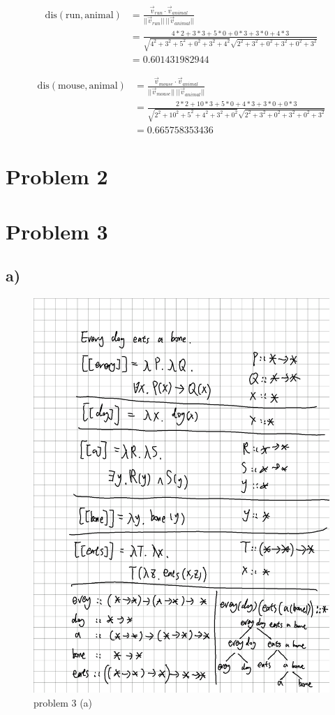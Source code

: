 \documentclass[twoside,11pt]{homework}
\begin{document}
\begin{itemize}
  \[
  \begin{aligned}
  \text{dis}(\text{run}, \text{animal})
  &= \frac{\vec{v}_{run} \cdot \vec{v}_{animal}}{||\vec{v}_{run}|| \ ||\vec{v}_{animal}||}\\
  &= \frac{4*2 + 3*3 + 5*0 + 0*3 + 3*0 + 4*3}{ \sqrt{4^2+3^2+5^2+0^2+3^2+4^2}
    \sqrt{2^2+3^2+0^2+3^2+0^2+3^2}}\\
  &= 0.601431982944 
  \end{aligned}
  \]

  \[
  \begin{aligned}
  \text{dis}(\text{mouse}, \text{animal})
  &= \frac{\vec{v}_{mouse} \cdot \vec{v}_{animal}}{||\vec{v}_{mouse}|| \ ||\vec{v}_{animal}||}\\
  &= \frac{2*2 + 10*3 + 5*0 + 4*3 + 3*0 + 0*3}{ \sqrt{2^2+10^2+5^2+4^2+3^2+0^2}
    \sqrt{2^2+3^2+0^2+3^2+0^2+3^2}}\\
  &= 0.665758353436 
  \end{aligned}
  \]

\end{itemize}

\section*{Problem 2}

\section*{Problem 3}
\subsection*{a)}
  \begin{figure}[h]
  	\centering
  	\includegraphics[width=0.7\linewidth]{../parse_tree}
  	\caption{problem 3 (a)}
  	\label{fig:01}
  \end{figure}
\end{document}
